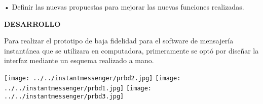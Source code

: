 \documentclass[11pt,a4paper]{report}
\begin{document}
•	Definir las nuevas propuestas para mejorar las nuevas funciones realizadas.\newpage
 

\textbf{DESARROLLO}\vspace{0,5cm}

Para realizar el prototipo de baja fidelidad para el software de mensajería instantánea\vspace{0,5cm}  que se utilizara en computadora, primeramente se optó por diseñar la interfaz mediante\vspace{0,5cm} un esquema realizado a mano.\vspace{0,5cm}


\texttt{[image: ../../instantmessenger/prbd2.jpg]} 
\texttt{[image: ../../instantmessenger/prbd1.jpg]} 
 \texttt{[image: ../../instantmessenger/prbd3.jpg]} \newpage
\end{document}
